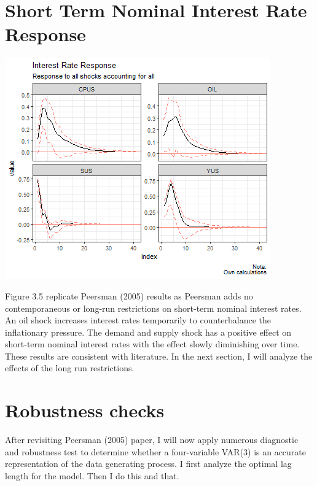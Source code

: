 \documentclass[11pt,preprint, authoryear]{elsarticle}
\let\origfigure\figure
\let\endorigfigure\endfigure
\renewenvironment{figure}[1][2] {
    \expandafter\origfigure\expandafter[H]
} {
    \endorigfigure
}
\numberwithin{equation}{section}
\numberwithin{figure}{section}
\numberwithin{table}{section}
\begin{document}
\hypertarget{short-term-nominal-interest-rate-response}{%
\section{Short Term Nominal Interest Rate
Response}\label{short-term-nominal-interest-rate-response}}

\begin{figure}[H]

{\centering \includegraphics{replication_files/figure-latex/Figure5-1} 

}

\caption{Interest Rate Response\label{Figure5}}\label{fig:Figure5}
\end{figure}

Figure 3.5 replicate Peersman (2005) results as Peersman adds no
contemporaneous or long-run restrictions on short-term nominal interest
rates. An oil shock increases interest rates temporarily to
counterbalance the inflationary pressure. The demand and supply shock
has a positive effect on short-term nominal interest rates with the
effect slowly diminishing over time. These results are consistent with
literature. In the next section, I will analyze the effects of the long
run restrictions.

\hypertarget{robustness-checks}{%
\section{Robustness checks}\label{robustness-checks}}

After revisiting Peersman (2005) paper, I will now apply numerous
diagnostic and robustness test to determine whether a four-variable
VAR(3) is an accurate representation of the data generating process. I
first analyze the optimal lag length for the model. Then I do this and
that.
\end{document}
